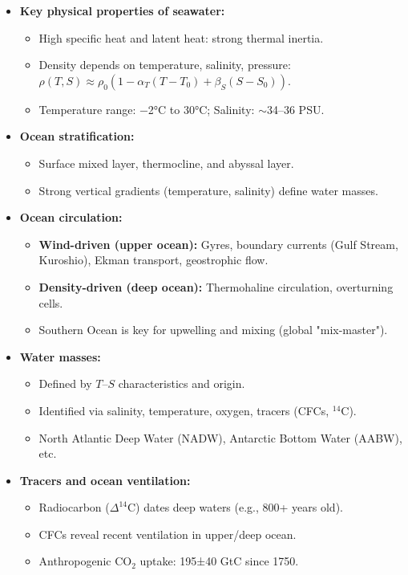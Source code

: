 \documentclass[fontsize=8pt, a4paper, landscape, fleqn]{scrartcl}
\begin{document}
\begin{multicols*}{3}[\raggedcolumns]
\begin{itemize}
    \item \textbf{Key physical properties of seawater:}
    \begin{itemize}
        \item High specific heat and latent heat: strong thermal inertia.
        \item Density depends on temperature, salinity, pressure: $\rho(T,S) \approx \rho_0(1 - \alpha_T(T - T_0) + \beta_S(S - S_0))$.
        \item Temperature range: −2°C to 30°C; Salinity: $\sim$34–36 PSU.
    \end{itemize}

    \item \textbf{Ocean stratification:}
    \begin{itemize}
        \item Surface mixed layer, thermocline, and abyssal layer.
        \item Strong vertical gradients (temperature, salinity) define water masses.
    \end{itemize}

    \item \textbf{Ocean circulation:}
    \begin{itemize}
        \item \textbf{Wind-driven (upper ocean):} Gyres, boundary currents (Gulf Stream, Kuroshio), Ekman transport, geostrophic flow.
        \item \textbf{Density-driven (deep ocean):} Thermohaline circulation, overturning cells.
        \item Southern Ocean is key for upwelling and mixing (global "mix-master").
    \end{itemize}

    \item \textbf{Water masses:}
    \begin{itemize}
        \item Defined by $T$–$S$ characteristics and origin.
        \item Identified via salinity, temperature, oxygen, tracers (CFCs, $^{14}$C).
        \item North Atlantic Deep Water (NADW), Antarctic Bottom Water (AABW), etc.
    \end{itemize}

    \item \textbf{Tracers and ocean ventilation:}
    \begin{itemize}
        \item Radiocarbon ($\Delta^{14}$C) dates deep waters (e.g., 800+ years old).
        \item CFCs reveal recent ventilation in upper/deep ocean.
        \item Anthropogenic CO$_2$ uptake: 195±40 GtC since 1750.
    \end{itemize}


\end{itemize}
\end{multicols*}
\end{document}
